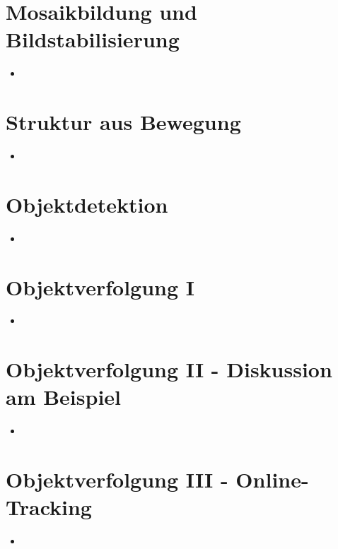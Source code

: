 \documentclass{report}
\begin{document}
	
	\section{Mosaikbildung und Bildstabilisierung}
	
	\begin{itemize}
		\item 
	\end{itemize}
	
	
	\section{Struktur aus Bewegung}
	
	\begin{itemize}
		\item 
	\end{itemize}
	
	
	\section{Objektdetektion}
	
	\begin{itemize}
		\item 
	\end{itemize}
	
	
	\section{Objektverfolgung I}
	
	\begin{itemize}
		\item 
	\end{itemize}
	
	
	\section{Objektverfolgung II - Diskussion am Beispiel}
	
	\begin{itemize}
		\item 
	\end{itemize}
	
	
	\section{Objektverfolgung III - Online-Tracking}
	
	\begin{itemize}
		\item 
	\end{itemize}
	
\end{document}
